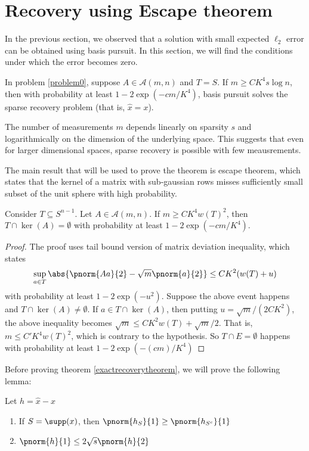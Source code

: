 \section{Recovery using Escape theorem}\label{escapesec}
In the previous section, we observed that
a solution with small expected $\ell_2$ error can be obtained
using basis pursuit. In this section, we will
find the conditions under which the error becomes
zero.

\begin{theorem}\label{exactrecoverytheorem}
	In problem \eqref{problem0}, suppose $A\in\mathcal{A}(m, n)$ and
	$T = S$. If $m\geq CK^4 s\log n$, then with
	probability at least $1-2\exp(-cm/K^4)$,
	basis pursuit solves the sparse recovery problem
	(that is, $\hat{x} = x$).
	\end{theorem}
\begin{remark}
	The number of measurements $m$ depends linearly on
	sparsity $s$ and logarithmically on the dimension of
	the underlying space. This suggests that even for larger
	dimensional spaces, sparse recovery is possible with
	few meausrements.
\end{remark}
The main result that will be used to prove the theorem
is escape theorem, which states that the kernel of a matrix
with sub-gaussian rows misses sufficiently small subset of the unit sphere
with high probability.

\begin{theorem}\label{escapetheorem}
	Consider $T\subseteq S^{n-1}$. Let $A\in \mathcal{A}(m, n)$. If
	$m\geq CK^4w(T)^2$, then 
	$T\cap \ker(A) = \emptyset$ with probability at least
	$1-2\exp(-cm/K^4)$.
\end{theorem}
\begin{proof}
	The proof uses tail bound version of matrix deviation inequality,
	which states
	$$\sup_{a\in T}\abs{\pnorm{Aa}{2}-\sqrt{m}\pnorm{a}{2}}
		\leq CK^2(w(T)+u)$$
	with probability at least $1-2\exp(-u^2)$.
	Suppose the above event happens and $T\cap\ker(A)\neq\emptyset$.
	If $a\in T\cap\ker(A)$, then putting $u = \sqrt{m}/(2CK^2)$,
	the above
	inequality becomes $\sqrt{m}\leq CK^2w(T) + \sqrt{m}/2$. That is,
	$m \leq C'K^4w(T)^2$, which is contrary to the hypothesis. So
	$T\cap E = \emptyset$ happens with probability at least $1-2\exp(-(cm)/K^4)$
\end{proof}

Before proving theorem \ref{exactrecoverytheorem}, we
will prove the following lemma:

\begin{lemma}\label{lemma1er}
	Let $h = \hat{x} - x$
	\begin{enumerate}
			\item If $S = \supp(x)$, then $\pnorm{h_S}{1}\geq \pnorm{h_{S^c}}{1}$

			\item $\pnorm{h}{1}\leq 2\sqrt{s}\pnorm{h}{2}$
	\end{enumerate}
\end{lemma}

